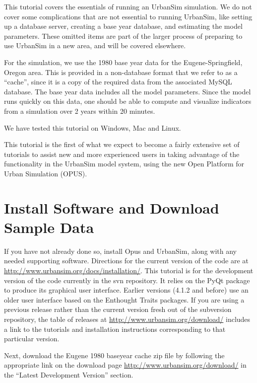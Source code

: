 \documentclass{howto}
\begin{document}
This tutorial covers the essentials of running an UrbanSim simulation.
We do not cover some complications that are not essential to running
UrbanSim, like setting up a database server, creating a base year database, and
estimating the model parameters.  These omitted items are part of the larger
process of preparing to use UrbanSim in a new area, and will be covered
elsewhere.

For the simulation, we use the 1980 base year data for the
Eugene-Springfield, Oregon area.  This is provided in a non-database
format that we refer to as a ``cache'', since it is a copy of the
required data from the associated MySQL database. The base year data
includes all the model parameters.  Since the model runs quickly on this data, one should be able to
compute and visualize indicators from a simulation over 2 years
within 20 minutes.

We have tested this tutorial on Windows, Mac and Linux.

This tutorial is the first of what we expect to become a fairly extensive
set of tutorials to assist new and more experienced users in taking
advantage of the functionality in the UrbanSim model system, using
the new Open Platform for Urban Simulation (OPUS).

\section*{Install Software and Download Sample Data}

If you have not already done so, install Opus and UrbanSim, along with
any needed supporting software.  Directions for the current version of
the code are at \url{http://www.urbansim.org/docs/installation/}.  
This tutorial is for the development version of the code currently in 
the svn repository.    It relies on the PyQt package to produce its 
graphical user interface. Earlier versions (4.1.2 and before) use an
older user interface based on the Enthought Traits packages.  If
you are using a previous release rather than the current
version fresh out of the subversion repository, the table of releases
at \url{http://www.urbansim.org/download/} includes a link to the 
tutorials and installation
instructions corresponding to that particular version.

Next, download the Eugene 1980 baseyear cache zip file by following the 
appropriate link on the download page 
\url{http://www.urbansim.org/download/} in the ``Latest Development Version''
section.
\end{document}
